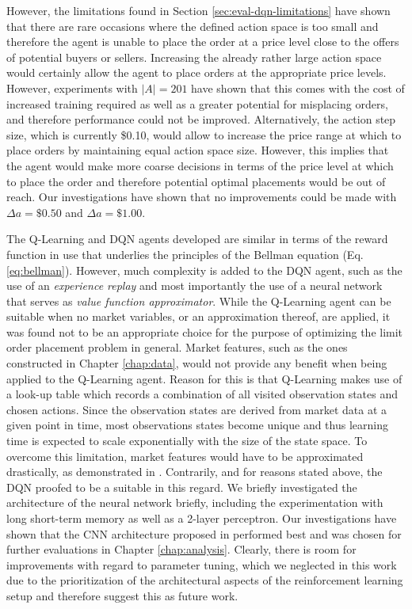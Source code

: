     However, the limitations found in Section \ref{sec:eval-dqn-limitations} have shown that there are rare occasions where the defined action space is too small and therefore the agent is unable to place the order at a price level close to the offers of potential buyers or sellers.
    Increasing the already rather large action space would certainly allow the agent to place orders at the appropriate price levels.
    However, experiments with $|A|=201$ have shown that this comes with the cost of increased training required as well as a greater potential for misplacing orders, and therefore performance could not be improved.
    Alternatively, the action step size, which is currently \$0.10, would allow to increase the price range at which to place orders by maintaining equal action space size.
    However, this implies that the agent would make more coarse decisions in terms of the price level at which to place the order and therefore potential optimal placements would be out of reach.
    Our investigations have shown that no improvements could be made with $\Delta{a}=\$0.50$ and $\Delta{a}=\$1.00$.

    The Q-Learning and DQN agents developed are similar in terms of the reward function in use that underlies the principles of the Bellman equation (Eq. \ref{eq:bellman}).
    However, much complexity is added to the DQN agent, such as the use of an \textit{experience replay} and most importantly the use of a neural network that serves as \textit{value function approximator}.
    While the Q-Learning agent can be suitable when no market variables, or an approximation thereof, are applied, it was found not to be an appropriate choice for the purpose of optimizing the limit order placement problem in general.
    Market features, such as the ones constructed in Chapter \ref{chap:data}, would not provide any benefit when being applied to the Q-Learning agent.
    Reason for this is that Q-Learning makes use of a look-up table which records a combination of all visited observation states and chosen actions.
    Since the observation states are derived from market data at a given point in time, most observations states become unique and thus learning time is expected to scale exponentially with the size of the state space\cite{whitehead1991complexity}.
    To overcome this limitation, market features would have to be approximated drastically, as demonstrated in \cite{nevmyvaka2006reinforcement}.
    Contrarily, and for reasons stated above, the DQN proofed to be a suitable in this regard.
    We briefly investigated the architecture of the neural network briefly, including the experimentation with long short-term memory\cite{gers1999learning} as well as a 2-layer perceptron.
    Our investigations have shown that the CNN architecture proposed in \cite{mnih2015human} performed best and was chosen for further evaluations in Chapter \ref{chap:analysis}.
    Clearly, there is room for improvements with regard to parameter tuning, which we neglected in this work due to the prioritization of the architectural aspects of the reinforcement learning setup and therefore suggest this as future work.

